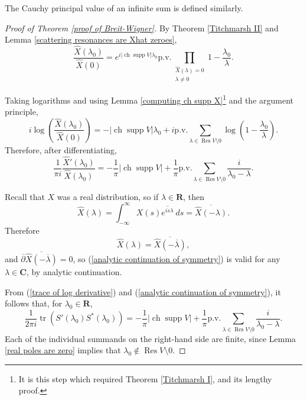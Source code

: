 \documentclass[12pt]{report}
\newcommand{\RR}{\mathbf{R}}
\newcommand{\CC}{\mathbf{C}}
\DeclareMathOperator{\ch}{ch}
\DeclareMathOperator{\Res}{Res}
\DeclareMathOperator{\supp}{supp}
\newcommand{\tr}{\operatorname{tr}}
\newcommand{\dbar}{\overline \partial}
\theoremstyle{definition}
\begin{document}
The Cauchy principal value of an infinite sum is defined similarly.
\begin{proof}[Proof of Theorem \ref{proof of Breit-Wigner}]
By Theorem \ref{Titchmarsh II} and Lemma \ref{scattering resonances are Xhat zeroes},
$$\frac{\hat X(\lambda_0)}{\hat X(0)} = e^{i|\ch\supp V|\lambda_0} \text{p.v.}\prod_{\substack{\hat X(\lambda) = 0\\\lambda \neq 0}} 1 - \frac{\lambda_0}{\lambda}.$$

Taking logarithms and using Lemma \ref{computing ch supp X}\footnote{It is this step which required Theorem \ref{Titchmarsh I}, and its lengthy proof.} and the argument principle,
$$i\log\left(\frac{\hat X(\lambda_0)}{\hat X(0)}\right) = -|\ch \supp V|\lambda_0 + i \text{p.v.}\sum_{\lambda \in \Res V \setminus 0} \log\left(1 - \frac{\lambda_0}{\lambda}\right).$$
Therefore, after differentiating,
$$\frac{1}{\pi i}\frac{\hat X'(\lambda_0)}{\hat X(\lambda_0)} = -\frac{1}{\pi}|\ch \supp V| + \frac{1}{\pi}\text{p.v.} \sum_{\lambda \in \Res V \setminus 0} \frac{i}{\lambda_0 - \lambda}.$$

Recall that $X$ was a real distribution, so if $\lambda \in \RR$, then
$$\hat X(\lambda) = \int_{-\infty}^\infty X(s) \overline{e^{is\lambda}} ~ds = \overline{\hat X(-\lambda)}.$$
Therefore
\begin{equation}
\label{analytic continuation of symmetry}
\hat X(\lambda) = \overline{\hat X(-\overline \lambda)},
\end{equation}
and $\dbar \overline{\hat X(-\overline \lambda)} = 0$, so (\ref{analytic continuation of symmetry}) is valid for any $\lambda \in \CC$, by analytic continuation.

From (\ref{trace of log derivative}) and (\ref{analytic continuation of symmetry}), it follows that, for $\lambda_0 \in \RR$,
\begin{equation}
\label{first two terms good}
\frac{1}{2\pi i}\tr(S'(\lambda_0)S^*(\lambda_0)) = -\frac{1}{\pi}|\ch \supp V| + \frac{1}{\pi} \text{p.v.} \sum_{\lambda \in \Res V \setminus 0} \frac{i}{\lambda_0 - \lambda}.
\end{equation}
Each of the individual summands on the right-hand side are finite, since Lemma \ref{real poles are zero} implies that $\lambda_0 \notin \Res V \setminus 0$.


\end{proof}
\end{document}
